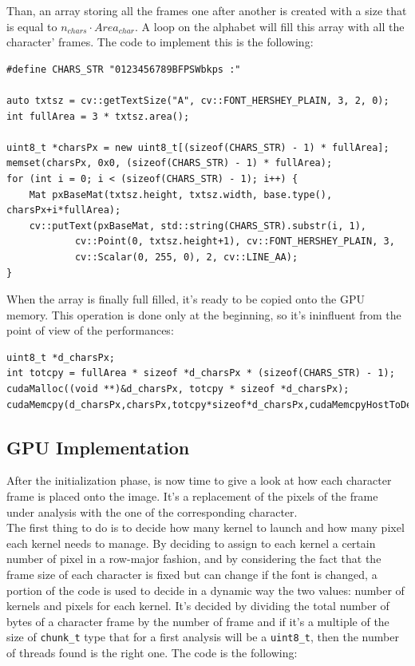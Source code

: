 \documentclass[paper=a4, fontsize=10pt]{scrartcl}	%
\begin{document}
	Than, an array storing all the frames one after another is created with a size that is equal to $ n_{chars} \cdot Area_{char} $. A loop on the alphabet will fill this array with all the character' frames. The code to implement this is the following:

	\begin{lstlisting}[style=CStyle]
#define CHARS_STR "0123456789BFPSWbkps :"

auto txtsz = cv::getTextSize("A", cv::FONT_HERSHEY_PLAIN, 3, 2, 0);
int fullArea = 3 * txtsz.area();
	
uint8_t *charsPx = new uint8_t[(sizeof(CHARS_STR) - 1) * fullArea];
memset(charsPx, 0x0, (sizeof(CHARS_STR) - 1) * fullArea);
for (int i = 0; i < (sizeof(CHARS_STR) - 1); i++) {
	Mat pxBaseMat(txtsz.height, txtsz.width, base.type(), charsPx+i*fullArea);
	cv::putText(pxBaseMat, std::string(CHARS_STR).substr(i, 1),
			cv::Point(0, txtsz.height+1), cv::FONT_HERSHEY_PLAIN, 3,
			cv::Scalar(0, 255, 0), 2, cv::LINE_AA);
}\end{lstlisting}

When the array is finally full filled, it's ready to be copied onto the GPU memory. This operation is done only at the beginning, so it's ininfluent from the point of view of the performances:

	\begin{lstlisting}[style=CStyle]
uint8_t *d_charsPx;
int totcpy = fullArea * sizeof *d_charsPx * (sizeof(CHARS_STR) - 1);
cudaMalloc((void **)&d_charsPx, totcpy * sizeof *d_charsPx);
cudaMemcpy(d_charsPx,charsPx,totcpy*sizeof*d_charsPx,cudaMemcpyHostToDev);
\end{lstlisting}

\subsection{GPU Implementation}
After the initialization phase, is now time to give a look at how each character frame is placed onto the image. It's a replacement of the pixels of the frame under analysis with the one of the corresponding character.\\

The first thing to do is to decide how many kernel to launch and how many pixel each kernel needs to manage. By deciding to assign to each kernel a certain number of pixel in a row-major fashion, and by considering the fact that the frame size of each character is fixed but can change if the font is changed, a portion of the code is used to decide in a dynamic way the two values: number of kernels and pixels for each kernel. It's decided by dividing the total number of bytes of a character frame by the number of frame and if it's a multiple of the size of \texttt{chunk\_t} type that for a first analysis will be a \texttt{uint8\_t}, then the number of threads found is the right one. The code is the following:
\end{document}
